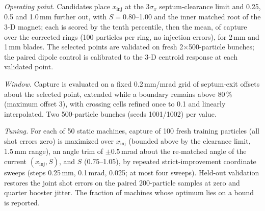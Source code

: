 \documentclass[aps,prab,preprint,amsmath,amssymb,floatfix,longbibliography]{revtex4-2}
\begin{document}
\emph{Operating point.} Candidates place $x_\mathrm{inj}$ at the 3$\sigma_x$ septum-clearance limit and 0.25, 0.5 and
1.0\,mm further out, with $S=0.80$--1.00 and the inner matched root of the 3-D magnet; each is scored by the tenth
percentile, then the mean, of capture over the corrected rings (100 particles per ring, no injection errors), for
2\,mm and 1\,mm blades. The selected points are validated on fresh 2$\times$500-particle bunches; the paired dipole
control is calibrated to the 3-D centroid response at each validated point.

\emph{Window.} Capture is evaluated on a fixed 0.2\,mm/mrad grid of septum-exit offsets about the selected point,
extended while a boundary remains above 80\,\% (maximum offset 3), with crossing cells refined once to 0.1 and linearly
interpolated. Two 500-particle bunches (seeds 1001/1002) per value.

\emph{Tuning.} For each of 50 static machines, capture of 100 fresh training particles (all shot errors zero) is
maximized over $x_\mathrm{inj}$ (bounded above by the clearance limit, 1.5\,mm range), an angle trim of
$\pm0.5$\,mrad about the re-matched angle of the current $(x_\mathrm{inj},S)$, and $S$ (0.75--1.05), by repeated
strict-improvement coordinate sweeps (steps 0.25\,mm, 0.1\,mrad, 0.025; at most four sweeps). Held-out validation
restores the joint shot errors on the paired 200-particle samples at zero and quarter booster jitter. The fraction of
machines whose optimum lies on a bound is reported.
\end{document}
